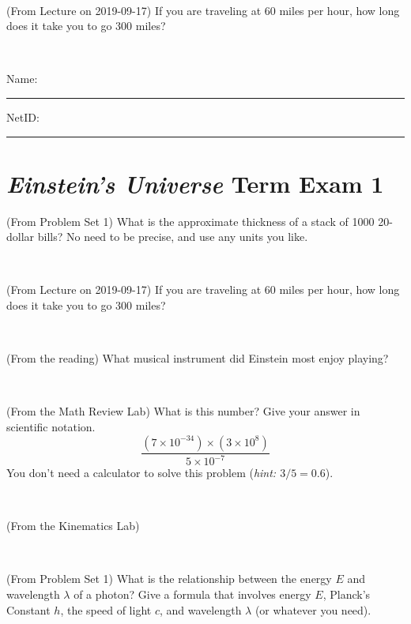 \documentclass[12pt, letterpaper]{article}
\begin{document}
\vfill ~

\begin{problem} (From Lecture on 2019-09-17)
If you are traveling at 60 miles per hour, how long does
it take you to go 300 miles?
\end{problem}


\vfill ~


\cleardoublepage



\noindent
Name: \rule[-1ex]{0.60\textwidth}{0.1pt}
NetID: \rule[-1ex]{0.20\textwidth}{0.1pt}

\section*{\textsl{Einstein's Universe} Term Exam 1}
\setcounter{problem}{1}


\begin{problem} (From Problem Set 1)
What is the approximate thickness of a stack of 1000 20-dollar bills?
No need to be precise, and use any units you like.
\end{problem}


\vfill ~

\begin{problem} (From Lecture on 2019-09-17)
If you are traveling at 60 miles per hour, how long does
it take you to go 300 miles?
\end{problem}


\vfill ~

\begin{problem} (From the reading)
What musical instrument did Einstein most enjoy playing?
\end{problem}


\vfill ~

\begin{problem} (From the Math Review Lab)
What is this number? Give your answer in scientific notation.
$$
\frac{(7\times10^{-34})\times(3\times10^8)}{5\times10^{-7}}
$$
You don't need a calculator to solve this problem (\textit{hint: $3/5=0.6$}).
\end{problem}


\vfill ~


\clearpage


\begin{problem} (From the Kinematics Lab)

\end{problem}


\vfill ~

\begin{problem} (From Problem Set 1)
What is the relationship between the energy $E$ and wavelength
$\lambda$ of a photon? Give a formula that involves energy $E$,
Planck's Constant $h$, the speed of light $c$, and wavelength
$\lambda$ (or whatever you need).
\end{problem}
\end{document}
